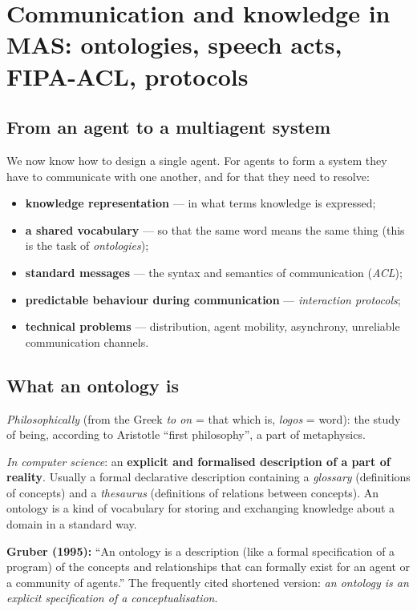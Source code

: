 \documentclass[11pt,a4paper]{article}
\theoremstyle{definition}
\providecommand{\uv}[1]{``#1''}
\begin{document}
\section{Communication and knowledge in MAS: ontologies, speech acts, FIPA-ACL, protocols}
\label{sec:komunikace}
\subsection{From an agent to a multiagent system}

We now know how to design a single agent. For agents to form a system they have to communicate with
one another, and for that they need to resolve:
\begin{itemize}
\item \textbf{knowledge representation} --- in what terms knowledge is expressed;
\item \textbf{a shared vocabulary} --- so that the same word means the same thing (this is the task of
  \emph{ontologies});
\item \textbf{standard messages} --- the syntax and semantics of communication (\emph{ACL});
\item \textbf{predictable behaviour during communication} --- \emph{interaction protocols};
\item \textbf{technical problems} --- distribution, agent mobility, asynchrony, unreliable
  communication channels.
\end{itemize}
\subsection{What an ontology is}

\begin{defbox}[Ontology]
\emph{Philosophically} (from the Greek \emph{to on} = that which is, \emph{logos} = word): the study
of being, according to Aristotle \uv{first philosophy}, a part of metaphysics.

\emph{In computer science}: an \textbf{explicit and formalised description of a part of reality}.
Usually a formal declarative description containing a \emph{glossary} (definitions of concepts) and a
\emph{thesaurus} (definitions of relations between concepts). An ontology is a kind of vocabulary for
storing and exchanging knowledge about a domain in a standard way.

\textbf{Gruber (1995):} \uv{An ontology is a description (like a formal specification of a program) of
the concepts and relationships that can formally exist for an agent or a community of agents.}
The frequently cited shortened version: \emph{an ontology is an explicit specification of a
conceptualisation}.
\end{defbox}
\end{document}
